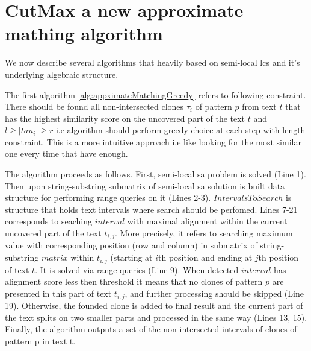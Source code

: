 \section{CutMax a new approximate mathing algorithm}
\label{section:our}
We now describe several algorithms that heavily based on semi-local lcs and it's underlying algebraic structure.

The first algorithm \ref{alg:appximateMatchingGreedy} refers to following constraint.
There should be found all non-intersected clones $\tau_{i}$ of pattern $p$ from text $t$ that has the highest similarity score on the uncovered part of the text $t$ and $l \geq |tau_{i}| \geq r$  i.e algorithm should perform greedy choice at each step with length constraint.
This is a more intuitive approach i.e like looking for the most similar one every time that have enough. 

The algorithm proceeds as follows.
First, semi-local sa problem is solved (Line 1).
Then upon string-substring submatrix of semi-local sa solution is built data structure for performing range queries on it (Lines 2-3).
$IntervalsToSearch$ is structure that holds text intervals where search should be perfomed.
Lines 7-21 corresponds to seaching $interval$ with maximal alignment within the current uncovered part of the text $t_{i,j}$.
More precisely, it refers to searching maximum value with corresponding position (row and column) in submatrix of string-substring $matrix$ within  $t_{i,j}$ (starting at $i$th position and ending at $j$th position of text $t$.
 It is solved via range queries (Line 9).
When detected $interval$ has alignment score less then threshold it means that no clones of pattern $p$ are presented in this part of text $t_{i,j}$, and further processing should be skipped (Line 19).
Otherwise, the founded clone is added to final result and the current part of the text splits on two smaller parts and processed in the same way (Lines 13, 15).
Finally, the algorithm outputs a set of the non-intersected intervals of clones of pattern p in text t.


